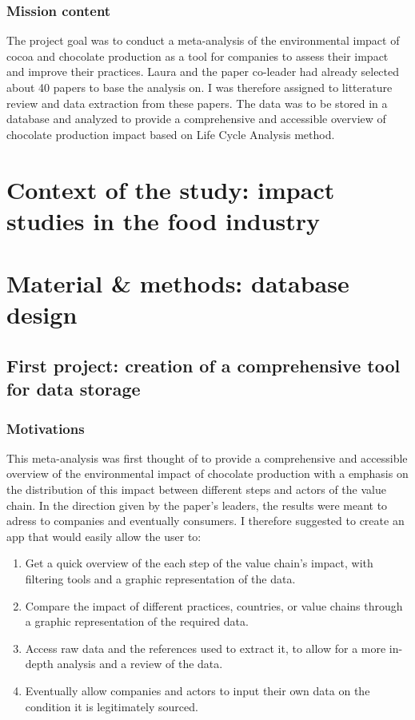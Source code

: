 \documentclass{article}
\begin{document}
\subsubsection{Mission content}
The project goal was to conduct a meta-analysis of the environmental impact of cocoa
and chocolate production as a tool for companies to assess their impact and
improve their practices. Laura and the paper co-leader had already selected
about 40 papers to base the analysis on. I was therefore assigned to
litterature review and data extraction from these papers. The data was to be
stored in a database and analyzed to provide a comprehensive and accessible
overview of chocolate production impact based on Life Cycle Analysis method.\\

\section{Context of the study: impact studies in the food industry}


\section{Material \& methods: database design}
\subsection{First project: creation of a comprehensive tool for data storage}
\subsubsection{Motivations}
This meta-analysis was first thought of to provide a comprehensive and
accessible overview of the environmental impact of chocolate production with a
emphasis on the distribution of this impact between different steps and actors
of the value chain. In the direction given by the paper's leaders, the results
were meant to adress to companies and eventually consumers. I therefore
suggested to create an app that would easily allow the user to:
\begin{enumerate}[label=\textbf{\roman*.}]
  \item Get a quick overview of the each step of the value chain's impact,
        with filtering tools and a graphic representation of the data.
  \item Compare the impact of different practices, countries, or value chains
        through a graphic representation of the required data.
  \item Access raw data and the references used to extract it, to allow for a
        more in-depth analysis and a review of the data.
  \item Eventually allow companies and actors to input their own data on the
        condition it is legitimately sourced.
\end{enumerate}
\end{document}
